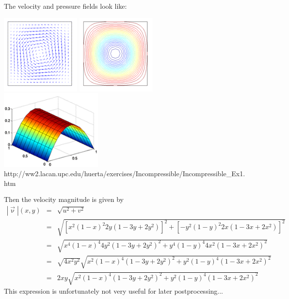 The velocity and pressure fields look like:

\begin{center}
\includegraphics[height=4cm]{images/mms/Ex1_Q2Q1_velo.png}
\includegraphics[height=4cm]{images/mms/Ex1_Q2Q1_streamlines.png}
\includegraphics[height=4cm]{images/mms/Ex1_Q2Q1_pres.png}\\
{\small http://ww2.lacan.upc.edu/huerta/exercises/Incompressible/Incompressible\_Ex1.htm}
\end{center}

Then the velocity magnitude is given by 
\begin{eqnarray}
|\vec\upnu|(x,y) 
&=& \sqrt{u^2+v^2} \\
&=& \sqrt{   
[x^2(1-x)^2 2y (1-3y+2y^2)]^2
+ [-y^2 (1 - y)^2 2x (1-3x+2x^2)]^2
} \\
&=& 
\sqrt{   
x^4(1-x)^4 4y^2 (1-3y+2y^2)^2
+ y^4 (1-y)^4 4x^2 (1-3x+2x^2)^2
} \\
&=& 
\sqrt{ 4x^2 y^2} 
\sqrt{   
x^2(1-x)^4 (1-3y+2y^2)^2
+ y^2 (1-y)^4 (1-3x+2x^2)^2
} \\
&=& 
2xy
\sqrt{   
x^2(1-x)^4 (1-3y+2y^2)^2
+ y^2 (1-y)^4 (1-3x+2x^2)^2
} \label{eq:dhvelnorm} 
\end{eqnarray}
This expression is unfortunately not very useful for later postprocessing...

